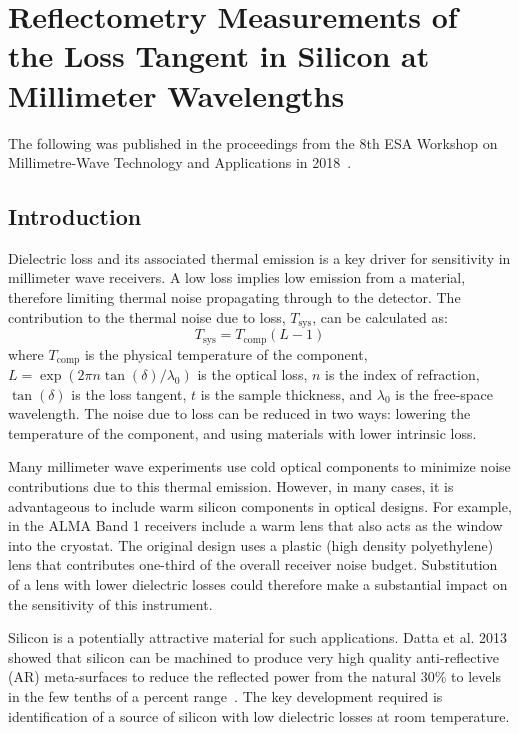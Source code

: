 \chapter{Reflectometry Measurements of the Loss Tangent in Silicon at Millimeter Wavelengths}
\label{ch:si}
The following was published in the proceedings from the 8th ESA Workshop on Millimetre-Wave Technology and Applications in 2018~\cite{ches18}.
\section{Introduction}
Dielectric loss and its associated thermal emission is a key driver for sensitivity in millimeter wave receivers. A low loss implies low emission from a material, therefore limiting thermal noise propagating through to the detector. The
contribution to the thermal noise due to loss,  $T_{\text{sys}}$, can be calculated as:
\begin{equation}
    T_{\text{sys}}=T_{\text{comp}}(L-1)
\end{equation}
where $T_{\text{comp}}$ is the physical temperature of the component, $L=\exp(2\pi n \tan(\delta)/\lambda_0)$ is the optical loss, $n$ is the index of refraction, $\tan(\delta)$ is the loss tangent, $t$ is the sample thickness, and $\lambda_0$ is the free-space wavelength. The noise due to loss can be reduced in two ways: lowering the temperature of the component, and using materials with lower intrinsic loss. 

Many millimeter wave experiments use cold optical components to minimize noise contributions due to this thermal
emission. However, in many cases, it is advantageous to include warm silicon components in optical designs. For example,
in the ALMA Band 1 receivers include a warm lens that also acts as the window into the cryostat. The original design
uses a plastic (high density polyethylene) lens that contributes one-third of the overall receiver noise budget. Substitution of a lens with lower dielectric losses could therefore make a substantial impact on the sensitivity of this instrument.

Silicon is a potentially attractive material for such applications. Datta et al. 2013 showed that silicon can be machined to produce very high quality anti-reflective (AR) meta-surfaces to reduce the reflected power from the natural 30\% to levels in the few tenths of a percent range~\cite{Datta:13}. The key development required is identification of a source of silicon with low dielectric losses at room temperature.

